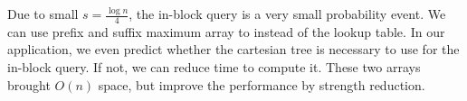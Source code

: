 \iffalse
運行區間查找時，一般依賴內建函數在 $O(1)$ 時間完成對數取整，
然而，在 VGLCS 這類型的動態規劃中，區間查找的對數結果是可以被預測的，預先將每一組詢問的區段對數結果儲存在陣列中，便可降低指令次數。
\fi

\iffalse
由於已知所有詢問區間，建立稀疏表時，可藉由動態規劃在 $O(n \log n)$ 排除掉不可能的計算 (參照算法 ~\ref{alg:reduce-boundary})，
降低過程中的計算量。由於 VGLCS 在平行操作需要 $O(n \log n)$，故使用動態規劃不影響我們的最終結果。
\fi



Due to small $s = \frac{\log n}{4}$, the in-block query is a very
small probability event.  We can use prefix and suffix maximum array
to instead of the lookup table.  In our application, we even predict
whether the cartesian tree is necessary to use for the in-block query.
If not, we can reduce time to compute it.  These two arrays brought
$O(n)$ space, but improve the performance by strength reduction.

\iffalse
從機率分佈的角度來看，因 $s = \frac{1}{4} \log n$ 過小，區間詢問完全落於 block 的機率低，
故額外維護區段前綴和後綴最大值 (prefix/suffix maximum value in block) 取代笛卡爾樹的建立。
藉這兩個額外儲存空間，將會增加空間複雜度的常數，卻能有效地降低整體的指令次數。
\fi
